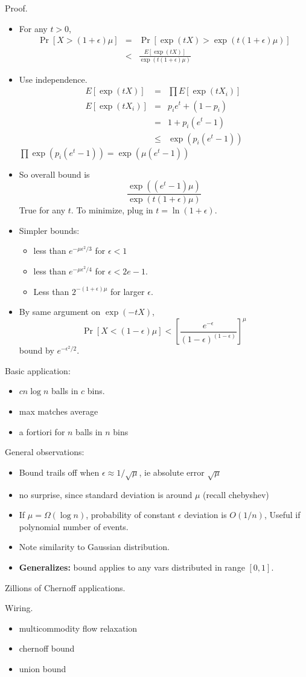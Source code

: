\documentclass{article}
\begin{document}
Proof.  
\begin{itemize}
\item For any $t>0$,
\begin{eqnarray*}
  \Pr[X > (1+\epsilon)\mu] &= &\Pr[\exp(tX) > \exp(t(1+\epsilon)\mu)]\\
  &< &\frac{E[\exp(tX)]}{\exp(t(1+\epsilon)\mu)}
\end{eqnarray*}
\item Use independence.
\begin{eqnarray*}
  E[\exp(tX)] &= &\prod E[\exp(tX_i)]\\
  E[\exp(tX_i)] &= &p_ie^t+(1-p_i) \\
  &= &1+p_i(e^t-1)\\
  &\le &\exp(p_i(e^t-1))
\end{eqnarray*}
$\prod \exp(p_i(e^t-1)) = \exp(\mu(e^t-1))$


\item So overall bound is
\[
\frac{\exp((e^t-1)\mu)}{\exp(t(1+\epsilon)\mu)}
\]
True for any $t$.  To minimize, plug in $t=\ln(1+\epsilon)$.  


\item Simpler bounds:
\begin{itemize}
\item less than $e^{-\mu\epsilon^2/3}$ for $\epsilon < 1$
\item less than $e^{-\mu \epsilon^2/4}$ for $\epsilon < 2e-1$.
\item Less than $2^{-(1+\epsilon)\mu}$ for larger $\epsilon$.
\end{itemize}

\item By same argument on $\exp(-tX)$,
\[
\Pr[X < (1-\epsilon)\mu] < 
\left[   \frac{e^{-\epsilon}}{(1-\epsilon)^{(1-\epsilon)}}\right]^\mu
  \]
  bound by $e^{-\epsilon^2/2}$.
\end{itemize}

Basic application:
\begin{itemize}
\item $cn\log n$ balls in $c$ bins.  
\item max matches average
\item a fortiori for $n$ balls in $n$ bins
\end{itemize}


General observations:
\begin{itemize}
  \item Bound trails off when $\epsilon \approx 1/\sqrt{\mu}$, ie
  absolute error $\sqrt{\mu}$
  \item no surprise, since standard deviation is around $\mu$ (recall
    chebyshev)  
  \item If $\mu = \Omega(\log n)$, probability of
    constant $\epsilon$ deviation
    is $O(1/n)$,  Useful if polynomial number of events.
  \item Note similarity to Gaussian distribution.
  \item  \textbf{Generalizes:} bound applies to any vars distributed in range
  $[0,1]$. 
\end{itemize}

Zillions of Chernoff applications.



Wiring.
\begin{itemize}
\item multicommodity flow relaxation
\item chernoff bound
\item union bound
\end{itemize}
\fi
\end{document}
